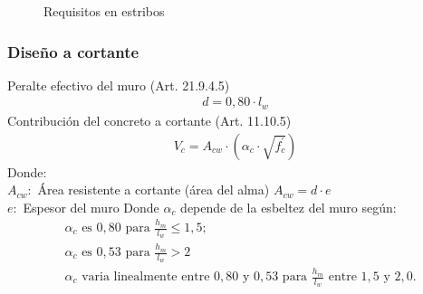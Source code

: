 \begin{figure}[h!]
    \centering
    \hspace{0mm}
    \caption{Requisitos en estribos}
    \label{reqv}
\end{figure}

\subsubsection{Diseño a cortante}

\noindent Peralte efectivo del muro (Art. 21.9.4.5)
\begin{align}
    d=0,80 \cdot l_{w}
\end{align}
Contribución del concreto a cortante (Art. 11.10.5)
\begin{align}
   V_{c}=A_{c w} \cdot\left(\alpha_{c} \cdot \sqrt{f_{c}^{\prime}}\right)
\end{align}
\noindent
Donde:\\
$A_{c w}:$ Área resistente a cortante (área del alma) $A_{c w}=d \cdot e$\\
$e:$ Espesor del muro Donde $\alpha_{c}$ depende de la esbeltez del muro según:
\begin{align*}
&\alpha_{c} \text { es } 0,80 \text { para } \frac{h_{m}}{l_{w}} \leq 1,5 ; \\
&\alpha_{c} \text { es } 0,53 \text { para } \frac{h_{m}}{l_{w}}>2 \\
&\alpha_{c} \text { varia linealmente entre } 0,80 \text { y } 0,53 \text { para } \frac{h_{m}}{l_{w}} \text { entre } 1,5 \text { y } 2,0.
\end{align*}

